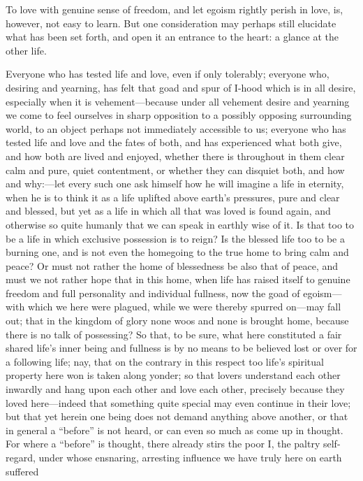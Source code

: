 \documentclass[12pt,a4paper]{book}
\begin{document}
To love with genuine sense of freedom, and let egoism rightly perish in
love, is, however, not easy to learn. But one consideration may perhaps
still elucidate what has been set forth, and open it an entrance to the
heart: a glance at the other life.

Everyone who has tested life and love, even if only tolerably; everyone
who, desiring and yearning, has felt that goad and spur of I-hood which is
in all desire, especially when it is vehement---because under all vehement
desire and yearning we come to feel ourselves in sharp opposition to a
possibly opposing surrounding world, to an object perhaps not immediately
accessible to us; everyone who has tested life and love and the fates of
both, and has experienced what both give, and how both are lived and
enjoyed, whether there is throughout in them clear calm and pure, quiet
contentment, or whether they can disquiet both, and how and why:---let
every such one ask himself how he will imagine a life in eternity, when he
is to think it as a life uplifted above earth's pressures, pure and clear
and blessed, but yet as a life in which all that was loved is found again,
and otherwise so quite humanly that we can speak in earthly wise of it. Is
that too to be a life in which exclusive possession is to reign? Is the
blessed life too to be a burning one, and is not even the homegoing to the
true home to bring calm and peace? Or must not rather the home of
blessedness be also that of peace, and must we not rather hope that in this
home, when life has raised itself to genuine freedom and full personality
and individual fullness, now the goad of egoism---with which we here were
plagued, while we were thereby spurred on---may fall out; that in the
kingdom of glory none woos and none is brought home, because there is no
talk of possessing? So that, to be sure, what here constituted a fair
shared life's inner being and fullness is by no means to be believed lost
or over for a following life; nay, that on the contrary in this respect too
life's spiritual property here won is taken along yonder; so that lovers
understand each other inwardly and hang upon each other and love each
other, precisely because they loved here---indeed that something quite
special may even continue in their love; but that yet herein one being does
not demand anything above another, or that in general a ``before'' is not
heard, or can even so much as come up in thought. For where a ``before'' is
thought, there already stirs the poor I, the paltry self-regard, under
whose ensnaring, arresting influence we have truly here on earth suffered
\end{document}
